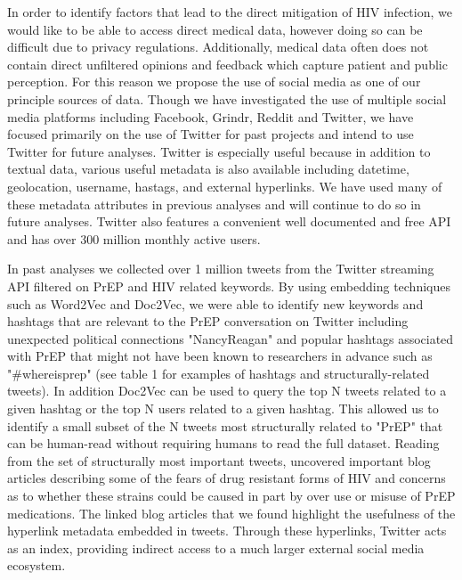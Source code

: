 In order to identify factors that lead to the direct mitigation of HIV infection, we would like to be able to access direct medical data, however doing so can be difficult due to privacy regulations. Additionally, medical data often does not contain direct unfiltered opinions and feedback which capture patient and public perception. For this reason we propose the use of social media as one of our principle sources of data. Though we have investigated the use of multiple social media platforms including Facebook, Grindr, Reddit and Twitter, we have focused primarily on the use of Twitter for past projects and intend to use Twitter for future analyses. Twitter is especially useful because in addition to textual data, various useful metadata is also available including datetime, geolocation, username, hastags, and external hyperlinks. We have used many of these metadata attributes in previous analyses and will continue to do so in future analyses. Twitter also features a convenient well documented and free API and has over 300 million monthly active users.

In past analyses we collected over 1 million tweets from the Twitter streaming API filtered on PrEP and HIV related keywords. By using embedding techniques such as Word2Vec and Doc2Vec, we were able to identify new keywords and hashtags that are relevant to the PrEP conversation on Twitter including unexpected political connections "NancyReagan" and popular hashtags associated with PrEP that might not have been known to researchers in advance such as "\#whereisprep" (see table 1 for examples of hashtags and structurally-related tweets). In addition Doc2Vec can be used to query the top N tweets related to a given hashtag or the top N users related to a given hashtag. This allowed us to identify a small subset of the N tweets most structurally related to "PrEP" that can be human-read without requiring humans to read the full dataset. Reading from the set of structurally most important tweets, uncovered important blog articles describing some of the fears of drug resistant forms of HIV and concerns as to whether these strains could be caused in part by over use or misuse of PrEP medications. The linked blog articles that we found highlight the usefulness of the hyperlink metadata embedded in tweets. Through these hyperlinks, Twitter acts as an index, providing indirect access to a much larger external social media ecosystem.

